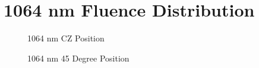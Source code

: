 \documentclass[journal,twoside,web]{ieeecolor}
\begin{document}
\section{1064 nm Fluence Distribution}
\label{app:1064Simulations}
\begin{figure}[htb!]
    \caption{\label{fig:1064-CZ} 1064 nm CZ Position}
\end{figure}

\begin{figure}[htb!]
    \caption{\label{fig:1064-45} 1064 nm 45 Degree Position}
\end{figure}
\end{document}
